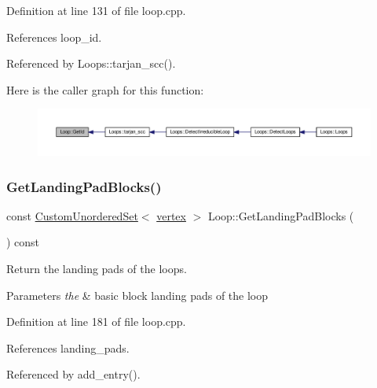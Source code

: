 Definition at line 131 of file loop.\+cpp.



References loop\+\_\+id.



Referenced by Loops\+::tarjan\+\_\+scc().

Here is the caller graph for this function\+:
\nopagebreak
\begin{figure}[H]
\begin{center}
\leavevmode
\includegraphics[width=350pt]{de/d77/classLoop_a2f959c9a7f38a30159bf6448bc093f58_icgraph}
\end{center}
\end{figure}
\mbox{\label{classLoop_a36c29ca47492fb97f4c2c64640a5ca4e}} 
\subsubsection{\texorpdfstring{Get\+Landing\+Pad\+Blocks()}{GetLandingPadBlocks()}}
{\footnotesize\ttfamily const \hyperlink{classCustomUnorderedSet}{Custom\+Unordered\+Set}$<$ \hyperlink{graph_8hpp_abefdcf0544e601805af44eca032cca14}{vertex} $>$ Loop\+::\+Get\+Landing\+Pad\+Blocks (\begin{DoxyParamCaption}{ }\end{DoxyParamCaption}) const}



Return the landing pads of the loops. 


\begin{DoxyParams}{Parameters}
{\em the} & basic block landing pads of the loop \\
\hline
\end{DoxyParams}


Definition at line 181 of file loop.\+cpp.



References landing\+\_\+pads.



Referenced by add\+\_\+entry().

